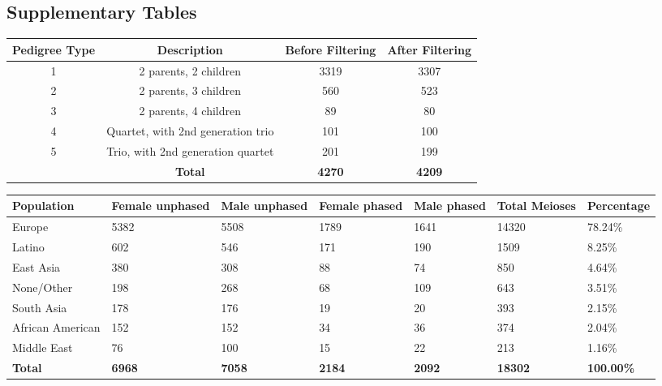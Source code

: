 \clearpage
\subsection{Supplementary Tables}


\begin{table}[!h] \centering
    \begin{tabular}{|c|c|c|c|} 
        \hline Pedigree Type & Description & Before Filtering & After Filtering \\ \hline
        1 & 2 parents, 2 children & 3319 & 3307 \\
        2 & 2 parents, 3 children & 560 & 523 \\
        3 & 2 parents, 4 children & 89 & 80 \\
        4 & Quartet, with 2nd generation trio & 101 & 100 \\
        5 & Trio, with 2nd generation quartet & 201 & 199 \\
        \hline & \textbf{Total} & \textbf{4270} & \textbf{4209} \\
    \hline \end{tabular}
\end{table}

\begin{table}[!h] \centering
    \begin{tabular}{|p{3cm}p{1.5cm}p{1.5cm}p{1.5cm}p{1.5cm}p{1.5cm}p{2cm}|}
        \hline 
    Population & Female \mbox{unphased} & Male \mbox{unphased} & Female phased & Male phased & Total Meioses & Percentage \\ \hline
    Europe & 5382 & 5508 & 1789 & 1641 & 14320 & 78.24\% \\
    Latino & 602 & 546 & 171 & 190 & 1509 & 8.25\% \\
    East Asia & 380 & 308 & 88 & 74 & 850 & 4.64\% \\
    None/Other & 198 & 268 & 68 & 109 & 643 & 3.51\% \\
    South Asia & 178 & 176 & 19 & 20 & 393 & 2.15\% \\
    African American & 152 & 152 & 34 & 36 & 374 & 2.04\% \\
    Middle East & 76 & 100 & 15 & 22 & 213 & 1.16\% \\
    \hline \textbf{Total} & \textbf{6968} & \textbf{7058} & \textbf{2184} & \textbf{2092} & \textbf{18302} & \textbf{100.00\%} \\
    \hline \end{tabular}
     {
    \label{tab:cointTS2}}
\end{table}

